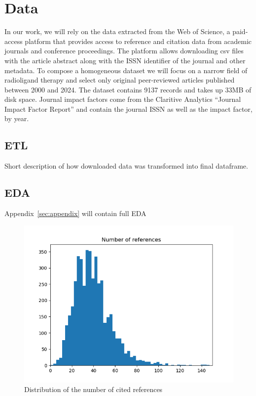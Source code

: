 \documentclass[11pt]{article}
\begin{document}
\section{Data}
In our work, we will rely on the data extracted from the Web of Science, a paid-access platform that provides access to reference and citation data from academic journals and conference proceedings. The platform allows downloading csv files with the article abstract along with the ISSN identifier of the journal and other metadata. To compose a homogeneous dataset we will focus on a narrow field of radioligand therapy and select only original peer-reviewed articles published between 2000 and 2024. The dataset contains 9137 records and takes up 33MB of disk space. Journal impact factors come from the Claritive Analytics “Journal Impact Factor Report” and contain the journal ISSN as well as the impact factor, by year.
\subsection{ETL}
Short description of how downloaded data was transformed into final dataframe. 
\subsection{EDA}
Appendix~\ref{sec:appendix} will contain full EDA

\begin{figure}
	\includegraphics[width= \columnwidth]{./Images/Ref_hist.png}
	\caption{Distribution of the number of cited references}
	\label{fig:img1}
\end{figure}
\end{document}
